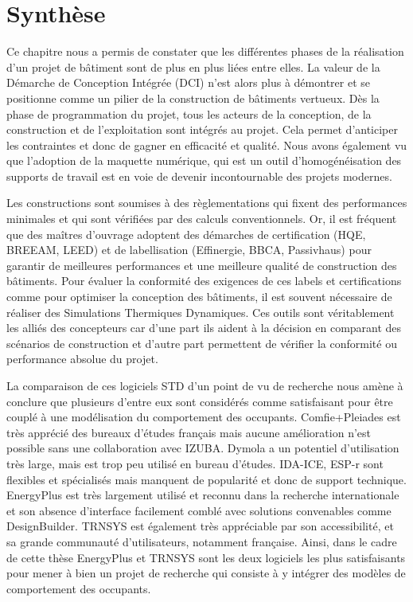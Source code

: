 \section{Synthèse}

Ce chapitre nous a permis de constater que les différentes phases de la réalisation d'un projet de bâtiment sont de plus en plus liées entre elles. La valeur de la Démarche de Conception Intégrée (DCI) n'est alors plus à démontrer et se positionne comme un pilier de la construction de bâtiments vertueux. Dès la phase de programmation du projet, tous les acteurs de la conception, de la construction et de l'exploitation sont intégrés au projet. Cela permet d'anticiper les contraintes et donc de gagner en efficacité et qualité. Nous avons également vu que l'adoption de la maquette numérique, qui est un outil d'homogénéisation des supports de travail est en voie de devenir incontournable des projets modernes.

Les constructions sont soumises à des règlementations qui fixent des performances minimales et qui sont vérifiées par des calculs conventionnels. Or, il est fréquent que des maîtres d'ouvrage adoptent des démarches de certification (HQE, BREEAM, LEED) et de labellisation (Effinergie, BBCA, Passivhaus) pour garantir de meilleures performances et une meilleure qualité de construction des bâtiments. Pour évaluer la conformité des exigences de ces labels et certifications comme pour optimiser la conception des bâtiments, il est souvent nécessaire de réaliser des Simulations Thermiques Dynamiques. Ces outils sont véritablement les alliés des concepteurs car d'une part ils aident à la décision en comparant des scénarios de construction et d'autre part permettent de vérifier la conformité ou performance absolue du projet.

La comparaison de ces logiciels STD d'un point de vu de recherche nous amène à conclure que plusieurs d'entre eux sont considérés comme satisfaisant pour être couplé à une modélisation du comportement des occupants. Comfie+Pleiades est très apprécié des bureaux d'études français mais aucune amélioration n'est possible sans une collaboration avec IZUBA. Dymola a un potentiel d'utilisation très large, mais est trop peu utilisé en bureau d'études. IDA-ICE, ESP-r sont flexibles et spécialisés mais manquent de popularité et donc de support technique. EnergyPlus est très largement utilisé et reconnu dans la recherche internationale et son absence d'interface facilement comblé avec solutions convenables comme DesignBuilder. TRNSYS est également très appréciable par son accessibilité, et sa grande communauté d'utilisateurs, notamment française. Ainsi, dans le cadre de cette thèse EnergyPlus et TRNSYS sont les deux logiciels les plus satisfaisants pour mener à bien un projet de recherche qui consiste à y intégrer des modèles de comportement des occupants.